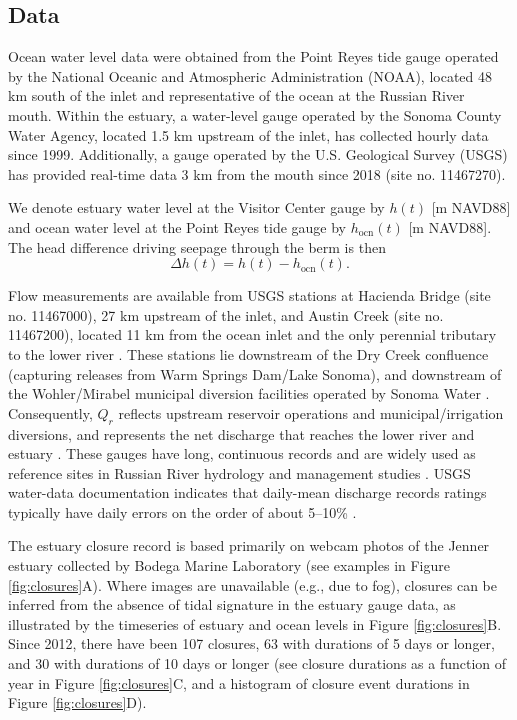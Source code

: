 \documentclass[preprint,12pt,authoryear]{elsarticle}
\begin{document}
\subsection{Data}

 Ocean water level data were obtained from the Point Reyes tide gauge operated by the National Oceanic and Atmospheric Administration (NOAA), located 48 km south of the inlet and representative of the ocean at the Russian River mouth. Within the estuary, a water-level gauge operated by the Sonoma County Water Agency, located 1.5 km upstream of the inlet, has collected hourly data  since 1999.
Additionally, a gauge operated by the U.S. Geological Survey (USGS) has provided real-time data 3 km from the mouth since 2018 (site no. 11467270). 

We denote estuary water level at the Visitor Center gauge by $h(t)$ [m NAVD88] and ocean water level at the Point Reyes tide gauge by $h_{\mathrm{ocn}}(t)$ [m NAVD88]. The head difference driving seepage through the berm is then
\[
\Delta h(t) = h(t) - h_{\mathrm{ocn}}(t).
\]

Flow measurements are available from USGS stations at Hacienda Bridge (site no. 11467000), 27 km upstream of the inlet, and Austin Creek (site no. 11467200), located 11 km from the ocean inlet and the only perennial tributary to the lower river \citep{usgs_nwis_sw}. 
These stations lie downstream of the Dry Creek confluence (capturing releases from Warm Springs Dam/Lake Sonoma), and downstream of the Wohler/Mirabel municipal diversion facilities operated by Sonoma Water \citep{sonomawater_watersupply}.  Consequently, $Q_r$  reflects upstream reservoir operations and municipal/irrigation diversions, and represents the net discharge that reaches the lower river and estuary \citep{ SonomaWater_FishFlowDEIR_2016}.  
These gauges have long, continuous records and are widely used as reference sites in Russian River hydrology and management studies \citep[e.g.,][]{anders2011water,newcomer2023prolonged}. 
USGS water-data documentation indicates that daily-mean discharge records ratings typically have daily errors on the order of about 5--10\% \citep{USGS_WDR_Documentation_Explanation, Rantz1982_streamflow}.



The  estuary closure record is based primarily on webcam photos of the Jenner estuary collected by Bodega Marine Laboratory (see examples in Figure \ref{fig:closures}A).  Where images are unavailable (e.g., due to fog), closures can be inferred from the absence of tidal signature in the estuary gauge data, as illustrated by the timeseries of estuary and ocean levels  in Figure \ref{fig:closures}B. 
Since 2012, there have been 107 closures, 63 with durations of 5 days or longer, and 30 with durations of 10 days or longer (see closure durations as a function of year in Figure \ref{fig:closures}C, and a histogram of closure event durations in Figure \ref{fig:closures}D).
\end{document}
